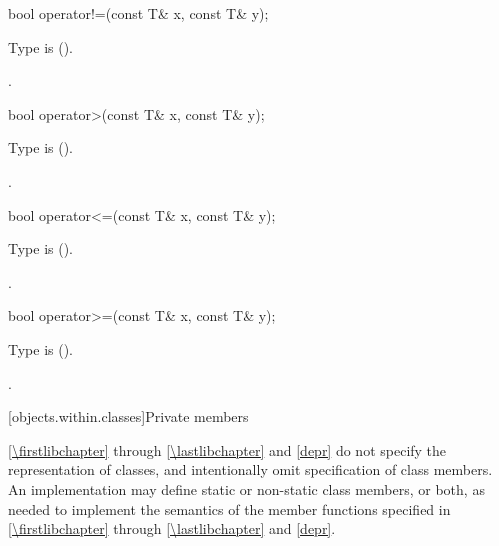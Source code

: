 %
\begin{itemdecl}
bool operator!=(const T& x, const T& y);
\end{itemdecl}

\begin{itemdescr}
\pnum
\requires
Type  is  ().

\pnum
\returns
{}.
\end{itemdescr}

%
\begin{itemdecl}
bool operator>(const T& x, const T& y);
\end{itemdecl}

\begin{itemdescr}
\pnum
\requires
Type  is  ().

\pnum
\returns
{}.
\end{itemdescr}

%
\begin{itemdecl}
bool operator<=(const T& x, const T& y);
\end{itemdecl}

\begin{itemdescr}
\pnum
\requires
Type  is  ().

\pnum
\returns
{}.
\end{itemdescr}

%
\begin{itemdecl}
bool operator>=(const T& x, const T& y);
\end{itemdecl}

\begin{itemdescr}
\pnum
\requires
Type  is  ().

\pnum
\returns
{}.
\end{itemdescr}

[objects.within.classes]{Private members}

\pnum
\ref{\firstlibchapter} through \ref{\lastlibchapter} and
\ref{depr} do not specify the representation of classes, and intentionally
omit specification of class members. An implementation may
define static or non-static class members, or both, as needed to implement the
semantics of the member functions specified in \ref{\firstlibchapter}
through \ref{\lastlibchapter} and \ref{depr}.


